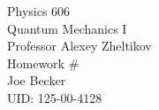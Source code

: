 \begin{titlepage}
\setlength{\topmargin}{1.5in}
\begin{center}
\Huge{Physics 606} \\
\LARGE{Quantum Mechanics I} \\
\Large{Professor Alexey Zheltikov} \\[1cm]

\huge{Homework \#\HWnum}\\[0.5cm]

\large{Joe Becker} \\
\large{UID: 125-00-4128} \\
\large{\due} 

\end{center}

\end{titlepage}

